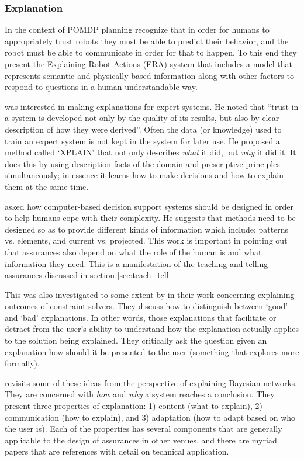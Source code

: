 \subsubsection{Explanation}
    In the context of POMDP planning \citet{Lomas2012-ie} recognize that in order for humans to appropriately trust robots they must be able to predict their behavior, and the robot must be able to communicate in order for that to happen. To this end they present the Explaining Robot Actions (ERA) system that includes a model that represents semantic and physically based information along with other factors to respond to questions in a human-understandable way.

    \citet{Swartout1983-ko} was interested in making explanations for expert systems. He noted that ``trust in a system is developed not only by the quality of its results, but also by clear description of how they were derived''. Often the data (or knowledge) used to train an expert system is not kept in the system for later use. He proposed a method called `XPLAIN' that not only describes \emph{what} it did, but \emph{why} it did it. It does this by using description facts of the domain and prescriptive principles simultaneously; in essence it learns how to make decisions and how to explain them at the same time.

    \citet{Rouse1986-dz} asked how computer-based decision support systems should be designed in order to help humans cope with their complexity. He suggests that methods need to be designed so as to provide different kinds of information which include: patterns vs. elements, and current vs. projected. This work is important in pointing out that assurances also depend on what the role of the human is and what information they need. This is a manifestation of the teaching and telling assurances discussed in section \ref{sec:teach_tell}.

    This was also investigated to some extent by \citet{Wallace2001-fm} in their work concerning explaining outcomes of constraint solvers. They discuss how to distinguish between `good' and `bad' explanations. In other words, those explanations that facilitate or detract from the user's ability to understand how the explanation actually applies to the solution being explained. They critically ask the question given an explanation how should it be presented to the user (something that \citet{Kuhn1997-qc} explores more formally).

    \citet{Lacave2002-cu} revisits some of these ideas from the perspective of explaining Bayesian networks. They are concerned with \emph{how} and \emph{why} a system reaches a conclusion. They present three properties of explanation: 1) content (what to explain), 2) communication (how to explain), and 3) adaptation (how to adapt based on who the user is). Each of the properties has several components that are generally applicable to the design of assurances in other venues, and there are myriad papers that are references with detail on technical application.


